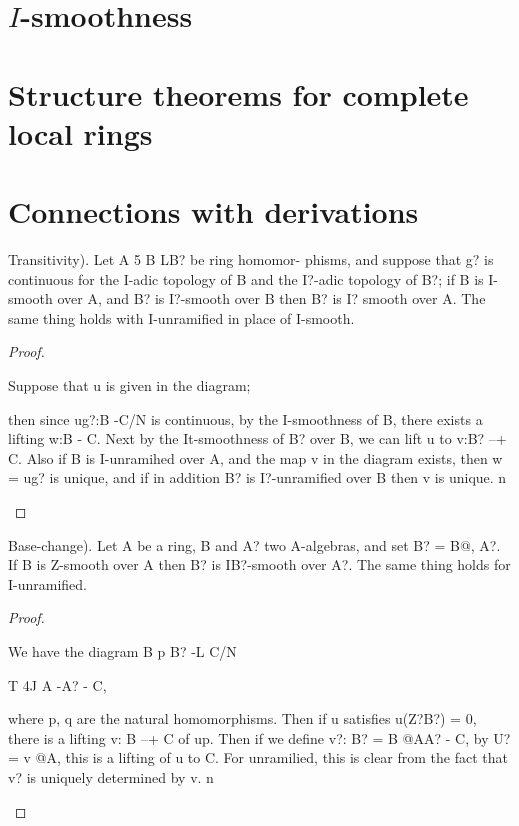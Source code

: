 
\section{$I$-smoothness}
\section{Structure theorems for complete local rings}
\section{Connections with derivations}

\begin{theorem}[Theorem 28.1]\label{mcrt-auto-theorem-28-1}\uses{}
\begin{mathematicalrecord}
Transitivity).    Let A 5 B LB?         be ring homomor-
phisms, and suppose that g? is continuous for the I-adic topology of B
and the I?-adic topology of B?; if B is I-smooth over A, and B? is I?-smooth
over B then B? is I? smooth over A. The same thing holds with I-unramified
in place of I-smooth.
\end{mathematicalrecord}
\end{theorem}
\begin{proof}
\begin{mathematicalrecord}
Suppose that u is given in the diagram;




then since ug?:B -C/N         is continuous, by the I-smoothness of B, there
exists a lifting w:B - C. Next by the It-smoothness of B? over B, we can
lift u to v:B? --+ C. Also if B is I-unramihed over A, and the map v in the
diagram exists, then w = ug? is unique, and if in addition B? is I?-unramified
over B then v is unique. n
\end{mathematicalrecord}
\end{proof}


\begin{theorem}[Theorem 28.2]\label{mcrt-auto-theorem-28-2}\uses{}
\begin{mathematicalrecord}
Base-change). Let A be a ring, B and A? two A-algebras,
and set B? = B@, A?. If B is Z-smooth over A then B? is IB?-smooth over
A?. The same thing holds for I-unramified.
\end{mathematicalrecord}
\end{theorem}
\begin{proof}
\begin{mathematicalrecord}
We have the diagram
             B p       B? -L    C/N


             T        4J
             A -A?         -    C,

    where p, q are the natural homomorphisms.      Then if u satisfies u(Z?B?) = 0,
    there is a lifting v: B --+ C of up. Then if we define v?: B? = B @AA? - C,
    by U? = v @A, this is a lifting of u to C. For unramilied, this is clear from
    the fact that v? is uniquely determined by v. n
\end{mathematicalrecord}
\end{proof}


